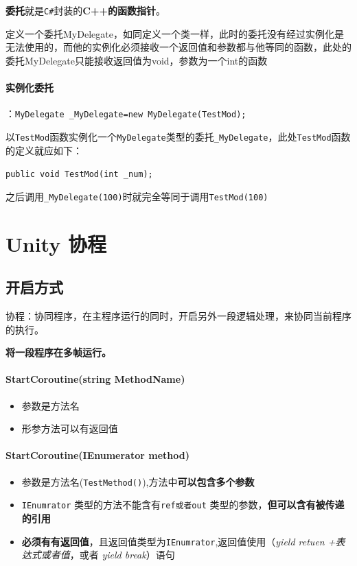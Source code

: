 \documentclass[UTF8,a4paper,12pt]{ctexbook}
\begin{document}
			\textbf{委托}就是\verb|C#|封装的\textbf{C++的函数指针}。
			
			定义一个委托MyDelegate，如同定义一个类一样，此时的委托没有经过实例化是无法使用的，而他的实例化必须接收一个返回值和参数都与他等同的函数，此处的委托MyDelegate只能接收返回值为void，参数为一个int的函数
			
		\paragraph{实例化委托}：\verb|MyDelegate _MyDelegate=new MyDelegate(TestMod);|
			
			以\verb|TestMod|函数实例化一个\verb|MyDelegate|类型的委托\verb|_MyDelegate|，此处\verb|TestMod|函数的定义就应如下：
				
			\verb|public void TestMod(int _num);|
				
			之后调用\verb|_MyDelegate(100)|时就完全等同于调用\verb|TestMod(100)|
		
		
		
	\section{Unity 协程}
		\subsection{开启方式}
			协程：协同程序，在主程序运行的同时，开启另外一段逻辑处理，来协同当前程序的执行。
			
			\textbf{将一段程序在多帧运行。}
			
			\paragraph{StartCoroutine(string MethodName)}
				\begin{itemize}
					\item 参数是方法名					
					\item 形参方法可以有返回值
				\end{itemize}
			
			\paragraph{StartCoroutine(IEnumerator method)}
				\begin{itemize}
					\item 参数是方法名(\verb|TestMethod()|),方法中\textbf{可以包含多个参数}
					\item \verb|IEnumrator| 类型的方法不能含有\verb|ref或者out| 类型的参数，\textbf{但可以含有被传递的引用}
					\item \textbf{必须有有返回值}，且返回值类型为\verb|IEnumrator|,返回值使用（\textit{yield retuen +表达式或者值}，或者 \textit{yield break}）语句	
			\end{itemize}
		
\end{document}
